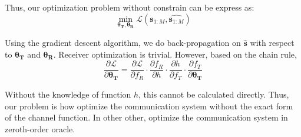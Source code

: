 \documentclass[12pt,a4paper]{article}
\begin{document}
	{\color{blue}
	\par Thus, our optimization problem without constrain can be express as:
	\begin{equation}
	\min\limits_{\bm{\theta_T},\bm{\theta_R}}\mathcal{L}(\bm{s}_{1:M},\hat{\bm{s}_{1:M}})
	\end{equation}
	}
	\par Using the gradient descent algorithm, we do back-propagation on $\hat{\bm{s}}$ with respect to $\bm{\theta_T}$ and $\bm{\theta_R}$. Receiver optimization is trivial. However, based on the chain rule,
	\begin{equation}
		\frac{\partial\mathcal{L}}{\partial\bm{\theta_T}}=\frac{\partial\mathcal{L}}{\partial f_R}\cdot\frac{\partial f_R}{\partial h}\cdot\frac{\partial h}{\partial f_T}\cdot\frac{\partial f_T}{\partial\bm{\theta_T}}
	\end{equation}
	\par Without the knowledge of function $h$, this cannot be calculated directly. {\color{blue} Thus, our problem is how optimize the communication system without the exact form of the channel function. In other other, optimize the communication system in zeroth-order oracle.}
\end{document}
